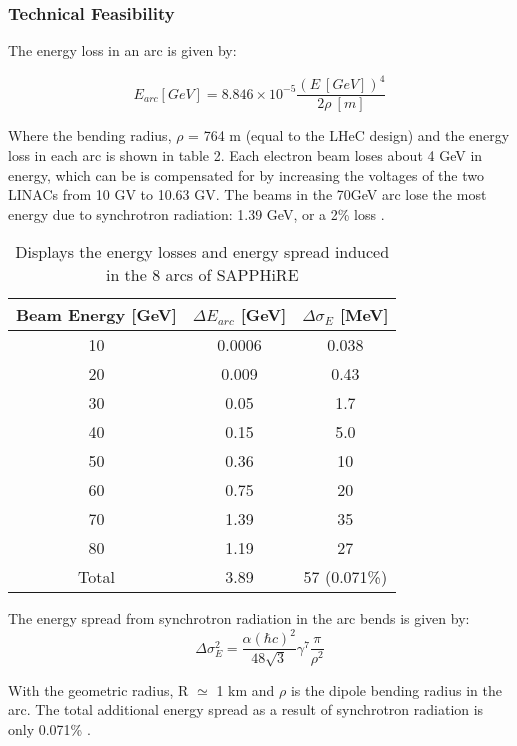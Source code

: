\subsubsection{Technical Feasibility}
The energy loss in an arc is given by:

\begin{equation}
E_{arc}[GeV]=8.846 \times 10^{-5}\frac{(E \ [GeV])^{4}}{2\rho \ [m]}
\end{equation}

Where the bending radius, $\rho$ = 764 m (equal to the LHeC design) and the energy loss in each arc is shown in table 2. Each electron beam loses about 4 GeV in energy, which can be is compensated for by increasing the voltages of the two LINACs from 10 GV to 10.63 GV. The beams in the 70GeV arc lose the most energy due to synchrotron radiation: 1.39 GeV, or a 2\% loss \cite{Bogacz:SAPPHiRE}.

\begin{table}
\begin{center}
\begin{tabular}{c c c}
\hline
\hline
Beam Energy [GeV] & $\Delta E_{arc}$ [GeV] & $\Delta\sigma_{E}$ [MeV]\\
\hline
10 & 0.0006 & 0.038\\
20 & 0.009 & 0.43\\
30 & 0.05 & 1.7\\
40 & 0.15 & 5.0\\
50 & 0.36 & 10\\
60 & 0.75 & 20\\
70 & 1.39 & 35\\
80 & 1.19 & 27\\
\hline
Total & 3.89 & 57 (0.071\%)\\
\hline
\hline
\end{tabular}
\caption{Displays the energy losses and energy spread induced in the 8 arcs of SAPPHiRE}
\end{center}
\end{table}

The energy spread from synchrotron radiation in the arc bends is given by:
\begin{equation}
\Delta\sigma^{2}_{E}=\frac{\alpha(\hbar c)^{2}}{48\sqrt{3}}\gamma^{7}\frac{\pi}{\rho^{2}}
\end{equation}

With the geometric radius, R $\simeq$ 1 km and $\rho$ is the dipole bending radius in the arc. The total additional energy spread as a result of synchrotron radiation is only 0.071\% \cite{Bogacz:SAPPHiRE}.

